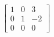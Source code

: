 \[
  \left[
  \begin{array}{ccc}
	  1 & 0 & 3 \\
	  0 & 1 & -2 \\
	  0 & 0 & 0
  \end{array}
  \right]
  \]